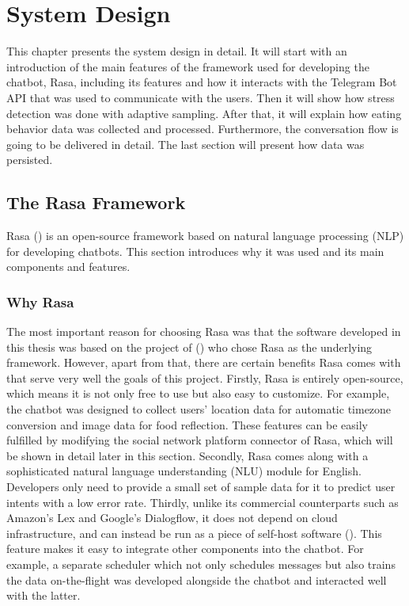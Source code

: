
\chapter{System Design}\label{chapter:sys_design}
This chapter presents the system design in detail. It will start with an introduction of the main features of the framework used for developing the chatbot, Rasa, including its features and how it interacts with the Telegram Bot API that was used to communicate with the users. Then it will show how stress detection was done with adaptive sampling. After that, it will explain how eating behavior data was collected and processed. Furthermore, the conversation flow is going to be delivered in detail. The last section will present how data was persisted.

\section{The Rasa Framework}
Rasa (\citeyear{10_rasa}) is an open-source framework based on natural language processing (NLP) for developing chatbots. This section introduces why it was used and its main components and features.

\subsection{Why Rasa}
The most important reason for choosing Rasa was that the software developed in this thesis was based on the project of \citeauthor{17_ludwig} (\citeyear{17_ludwig}) who chose Rasa as the underlying framework. However, apart from that, there are certain benefits Rasa comes with that serve very well the goals of this project. Firstly, Rasa is entirely open-source, which means it is not only free to use but also easy to customize. For example, the chatbot was designed to collect users' location data for automatic timezone conversion and image data for food reflection. These features can be easily fulfilled by modifying the social network platform connector of Rasa, which will be shown in detail later in this section. Secondly, Rasa comes along with a sophisticated natural language understanding (NLU) module for English. Developers only need to provide a small set of sample data for it to predict user intents with a low error rate. Thirdly, unlike its commercial counterparts such as Amazon's Lex and Google's Dialogflow, it does not depend on cloud infrastructure, and can instead be run as a piece of self-host software (\cite{24_why_rasa}). This feature makes it easy to integrate other components into the chatbot. For example, a separate scheduler which not only schedules messages but also trains the data on-the-flight was developed alongside the chatbot and interacted well with the latter.

